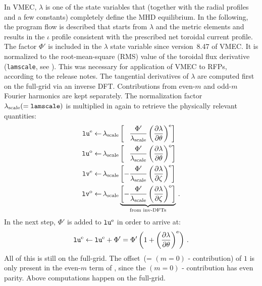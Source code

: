 In VMEC, $\lambda$ is one of the state variables that (together with the radial profiles and a few constants) completely define the MHD equilibrium.
In the following, the program flow is described that starts from $\lambda$ and the metric elements and results in the $\iota$ profile
consistent with the prescribed net toroidal current profile.
The factor $\Phi'$ is included in the $\lambda$ state variable since version~8.47 of VMEC.
It is normalized to the root-mean-square (RMS) value of the toroidal flux derivative (\texttt{lamscale}, see ).
This was necessary for application of VMEC to RFPs, according to the release notes.
The tangential derivatives of $\lambda$ are computed first on the full-grid via an inverse DFT.
Contributions from even-$m$ and odd-$m$ Fourier harmonics are kept separately.
The normalization factor $\lambda_\textrm{scale} (= \texttt{lamscale})$ is multiplied in again
to retrieve the physically relevant quantities:
\begin{align}
  \texttt{lu}^\mathrm{e} \leftarrow&\, \lambda_\textrm{scale}             \left[\phantom{-} \frac{\Phi'}{\lambda_\textrm{scale}} \left( \frac{\partial \lambda}{\partial \theta} \right)^\mathrm{e} \right] \\
  \texttt{lu}^\mathrm{o} \leftarrow&\, \lambda_\textrm{scale}             \left[\phantom{-} \frac{\Phi'}{\lambda_\textrm{scale}} \left( \frac{\partial \lambda}{\partial \theta} \right)^\mathrm{o} \right] \\
  \texttt{lv}^\mathrm{e} \leftarrow&\, \lambda_\textrm{scale}             \left[         -  \frac{\Phi'}{\lambda_\textrm{scale}} \left( \frac{\partial \lambda}{\partial \zeta } \right)^\mathrm{e} \right] \\
  \texttt{lv}^\mathrm{o} \leftarrow&\, \lambda_\textrm{scale} \underbrace{\left[         -  \frac{\Phi'}{\lambda_\textrm{scale}} \left( \frac{\partial \lambda}{\partial \zeta } \right)^\mathrm{o} \right]}_{\textrm{from inv-DFTs}} \, .
\end{align}
In the next step, $\Phi'$ is added to $\texttt{lu}^\mathrm{e}$ in order to arrive at:
\begin{equation}
 \texttt{lu}^\mathrm{e} \leftarrow \texttt{lu}^\mathrm{e} + \Phi' = \Phi' \left( 1 + \left(\frac{\partial \lambda}{\partial \theta} \right)^\mathrm{e} \right) \, . \label{eqn:lu_e_full}
\end{equation}
All of this is still on the full-grid.
The offset~(= $(m=0)$ - contribution) of $1$ is only present in the even-$m$ term of , since the $(m=0)$ - contribution has even parity.
Above computations happen on the full-grid.
